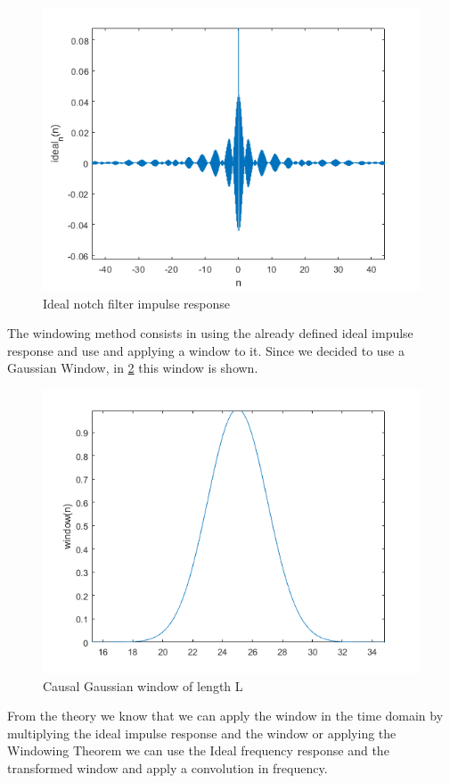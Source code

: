\documentclass[12pt,a4paper,twoside]{article}
\begin{document}
\begin{figure}[h!]
	\centering
	\includegraphics[width=0.8\linewidth]{Images/idealnotchimp.png}
	\caption{Ideal notch filter impulse response}
	\label{idealnotchimp}
\end{figure}
\noindent

The windowing method consists in using the already defined ideal impulse response and use and applying a window to it. Since we decided to use a Gaussian Window, in \figurename{ \ref{gauss}} this window is shown. 


\begin{figure}[h!]
	\centering
	\includegraphics[width=0.8\linewidth]{Images/gauss.png}
	\caption{Causal Gaussian window of length L}
	\label{gauss}
\end{figure}
\noindent

From the theory we know that we can apply the window in the time domain by multiplying the ideal impulse response and the window or applying the Windowing Theorem we can use the Ideal frequency response and the transformed window and apply a convolution in frequency.
\end{document}
